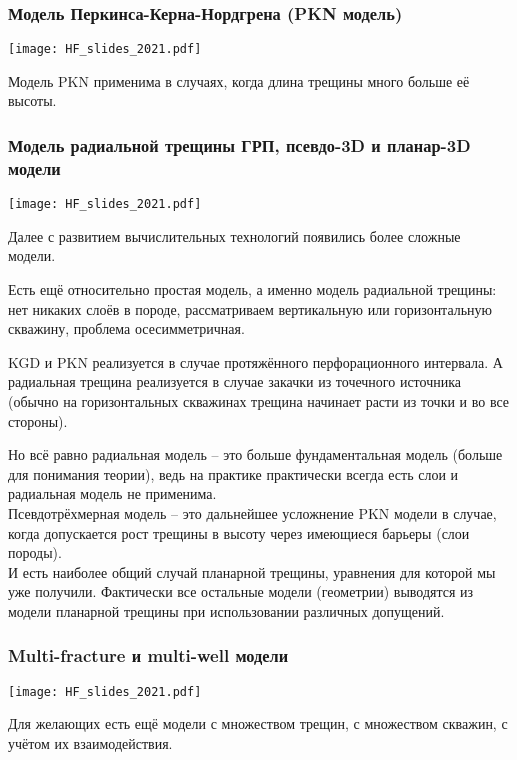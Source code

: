 \documentclass[main.tex]{subfiles}
\begin{document}
\subsubsection{Модель Перкинса-Керна-Нордгрена (PKN модель)}

\texttt{[image: HF\_slides\_2021.pdf]}

Модель PKN применима в случаях, когда длина трещины много больше её высоты.

\subsubsection{Модель радиальной трещины ГРП, псевдо-3D и планар-3D модели}

\texttt{[image: HF\_slides\_2021.pdf]}

Далее с развитием вычислительных технологий появились более сложные модели.

Есть ещё относительно простая модель, а именно модель радиальной трещины: нет никаких слоёв в породе, рассматриваем вертикальную или горизонтальную скважину, проблема осесимметричная.

KGD и PKN реализуется в случае протяжённого перфорационного интервала.
А радиальная трещина реализуется в случае закачки из точечного источника (обычно на горизонтальных скважинах трещина начинает расти из точки и во все стороны).

Но всё равно радиальная модель -- это больше фундаментальная модель (больше для понимания теории), ведь на практике практически всегда есть слои и радиальная модель не применима.
\\

Псевдотрёхмерная модель -- это дальнейшее усложнение PKN модели в случае, когда допускается рост трещины в высоту через имеющиеся барьеры (слои породы).
\\

И есть наиболее общий случай планарной трещины, уравнения для которой мы уже получили.
Фактически все остальные модели (геометрии) выводятся из модели планарной трещины при использовании различных допущений.

\subsubsection{Multi-fracture и multi-well модели}

\texttt{[image: HF\_slides\_2021.pdf]}

Для желающих есть ещё модели с множеством трещин, с множеством скважин, с учётом их взаимодействия.
\end{document}
